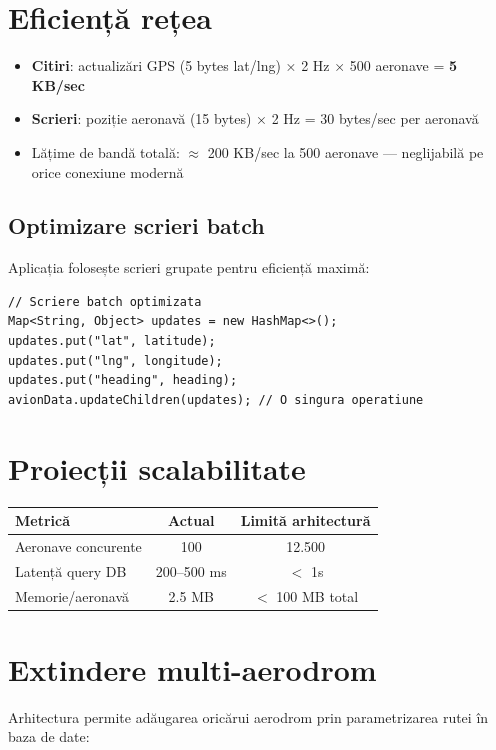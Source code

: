 \documentclass[11pt,a4paper]{report}
\begin{document}
\section{Eficiență rețea}

\begin{itemize}
    \item \textbf{Citiri}: actualizări GPS (5 bytes lat/lng) × 2 Hz × 500 aeronave
    = \textbf{5 KB/sec}
    \item \textbf{Scrieri}: poziție aeronavă (15 bytes) × 2 Hz = 30 bytes/sec
    per aeronavă
    \item Lățime de bandă totală: $\approx$ 200 KB/sec la 500 aeronave — neglijabilă
    pe orice conexiune modernă
\end{itemize}

\subsection{Optimizare scrieri batch}

Aplicația folosește scrieri grupate pentru eficiență maximă:

\begin{lstlisting}
// Scriere batch optimizata
Map<String, Object> updates = new HashMap<>();
updates.put("lat", latitude);
updates.put("lng", longitude);
updates.put("heading", heading);
avionData.updateChildren(updates); // O singura operatiune
\end{lstlisting}

\section{Proiecții scalabilitate}

\begin{tabular}{|l|c|c|}
\hline
\textbf{Metrică} & \textbf{Actual} & \textbf{Limită arhitectură} \\
\hline
Aeronave concurente & 100 & 12.500 \\
Latență query DB & 200–500 ms & $<$ 1s \\
Memorie/aeronavă & 2.5 MB & $<$ 100 MB total \\
\hline
\end{tabular}

\section{Extindere multi-aerodrom}

Arhitectura permite adăugarea oricărui aerodrom prin parametrizarea rutei
în baza de date:
\end{document}
